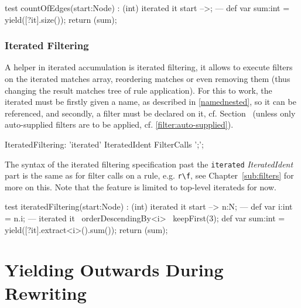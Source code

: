 \begin{example}
  \begin{grgen}
test countOfEdges(start:Node) : (int)
{
	iterated it {
		start -->;
	} 
---
	def var sum:int = yield([?it].size());
	return (sum);
}
  \end{grgen}
\end{example}
	
	
\subsubsection*{Iterated Filtering}\label{sub:iteratedfilter}

A helper in iterated accumulation is iterated filtering, it allows to execute filters on the iterated matches array, reordering matches or even removing them (thus changing the result matches tree of rule application).
For this to work, the iterated must be firstly given a name, as described in \ref{namednested}, so it can be referenced, and secondly, a filter must be declared on it, cf. Section~\label{cardinality} (unless only auto-supplied filters are to be applied, cf. \ref{filter:auto-supplied}).

\begin{rail}
  IteratedFiltering: 
    'iterated' IteratedIdent FilterCalls ';';
\end{rail}

The syntax of the iterated filtering specification past the \texttt{iterated} \emph{IteratedIdent} part is the same as for filter calls on a rule, e.g. \verb#r\f#, see Chapter~\ref{sub:filters} for more on this.
Note that the feature is limited to top-level iterateds for now.

\begin{example}
  \begin{grgen}
test iteratedFiltering(start:Node) : (int)
{
	iterated it {
		start --> n:N;
	---
		def var i:int = n.i;
	} 
---
	iterated it \ orderDescendingBy<i> \ keepFirst(3);
	def var sum:int = yield([?it].extract<i>().sum());
	return (sum);
}
  \end{grgen}
\end{example}


\pagebreak


\section{Yielding Outwards During Rewriting} \label{sec:localvarorderedevalyield}

